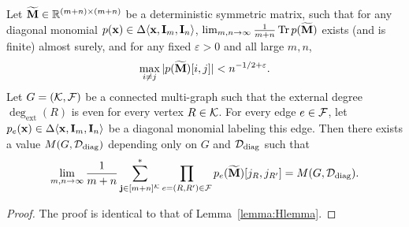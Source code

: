 \documentclass[10pt,reqno]{amsart}
\def\x{\mathbf{x}}
\def\R{\mathbb{R}}
\def\bx{\mathbf{x}}
\def\eps{\varepsilon}
\def\Tr{\operatorname{Tr}}
\newcommand{\degext}{\deg_\mathrm{ext}}
\newcommand{\tdiag}{\mathrm{diag}}
\begin{document}
\begin{lemma}\label{lemma:Hlemma_rec}
Let $\widetilde\Mb \in \R^{(m+n) \times (m+n)}$ be a deterministic symmetric
matrix, such that for any diagonal monomial
$p(\x) \in \Delta\langle \x,\bI_m,\bI_n \rangle$, 
$\lim_{m,n \to \infty} \frac{1}{m+n} \Tr p(\widetilde{\bM})$ exists (and is
finite) almost surely, and for any fixed $\eps>0$ and all large $m,n$,
\[\max_{i\neq j} |p(\widetilde\bM)[i,j]|<n^{-1/2+\eps}.\]
Let $G=(\mathcal{K},\mathcal{F})$ be a connected multi-graph such that 
the external degree $\degext(R)$ is even for every vertex $R\in\mathcal{K}$.
For every edge $e\in\mathcal{F}$, let $p_e(\x)\in\Delta\langle\bx,\bI_m,\bI_n\rangle$ 
be a diagonal monomial labeling this edge.
Then there exists a value $M(G,\cD_\tdiag)$ depending only on
$G$ and $\cD_\tdiag$ such that
\[\lim_{m,n \to \infty} \frac{1}{m+n}
\sum_{\bj\in[m+n]^{\cK}}^*
\prod_{e=(R,R')\in\cF} p_e(\widetilde\bM)[j_R, j_{R'}]
= M(G,\cD_\tdiag).\]
\end{lemma}
\begin{proof}
The proof is identical to that of Lemma~\ref{lemma:Hlemma}.
\end{proof}
\end{document}
